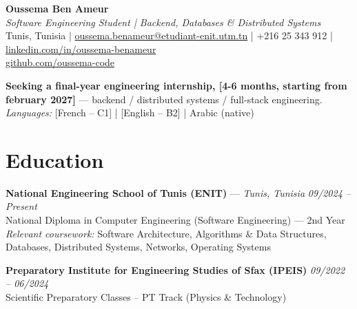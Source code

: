 \documentclass[11pt,a4paper]{article}
\begin{document}
\begin{center}
    {\Huge \textbf{Oussema Ben Ameur}} \\ \vspace{2pt}
    {\large \textit{Software Engineering Student | Backend, Databases \& Distributed Systems}} \\ \vspace{2pt}
    Tunis, Tunisia | \href{mailto:oussema.benameur@etudiant-enit.utm.tn}{oussema.benameur@etudiant-enit.utm.tn} | +216 25 343 912 | \href{https://www.linkedin.com/in/oussema-benameur-07151b246/}{linkedin.com/in/oussema-benameur} \\ \vspace{2pt} \href{https://github.com/oussema-code}{github.com/oussema-code}
\end{center}

\vspace{-2pt}
\noindent \textbf{Seeking a final-year engineering internship, [4-6 months, starting from february 2027]} --- backend / distributed systems / full-stack engineering. \textit{Languages:} [French -- C1] | [English -- B2] | Arabic (native)

\section{Education}
\textbf{National Engineering School of Tunis (ENIT)} --- \textit{Tunis, Tunisia} \hfill \textit{09/2024 -- Present} \\
National Diploma in Computer Engineering (Software Engineering) --- 2nd Year \\
\textit{Relevant coursework:} Software Architecture, Algorithms \& Data Structures, Databases, Distributed Systems, Networks, Operating Systems

\vspace{2pt}
\textbf{Preparatory Institute for Engineering Studies of Sfax (IPEIS)} \hfill \textit{09/2022 -- 06/2024} \\
Scientific Preparatory Classes -- PT Track (Physics \& Technology)
\end{document}
